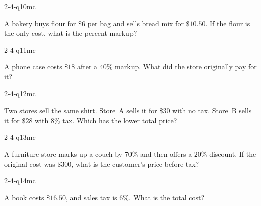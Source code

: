 \begin{practiceQuestion}{2-4-q10}{mc}
\begin{questionText}
A bakery buys flour for $\$6$ per bag and sells bread mix for $\$10.50$. If the flour is the only cost, what is the percent markup?
\end{questionText}
\end{practiceQuestion}

\begin{practiceQuestion}{2-4-q11}{mc}
\begin{questionText}
A phone case costs $\$18$ after a $40\%$ markup. What did the store originally pay for it?
\end{questionText}
\end{practiceQuestion}

\begin{practiceQuestion}{2-4-q12}{mc}
\begin{questionText}
Two stores sell the same shirt. Store~A sells it for $\$30$ with no tax. Store~B sells it for $\$28$ with $8\%$ tax. Which has the lower total price?
\end{questionText}
\end{practiceQuestion}

\begin{practiceQuestion}{2-4-q13}{mc}
\begin{questionText}
A furniture store marks up a couch by $70\%$ and then offers a $20\%$ discount. If the original cost was $\$300$, what is the customer's price before tax?
\end{questionText}
\end{practiceQuestion}

\begin{practiceQuestion}{2-4-q14}{mc}
\begin{questionText}
A book costs $\$16.50$, and sales tax is $6\%$. What is the total cost?
\end{questionText}
\end{practiceQuestion}

